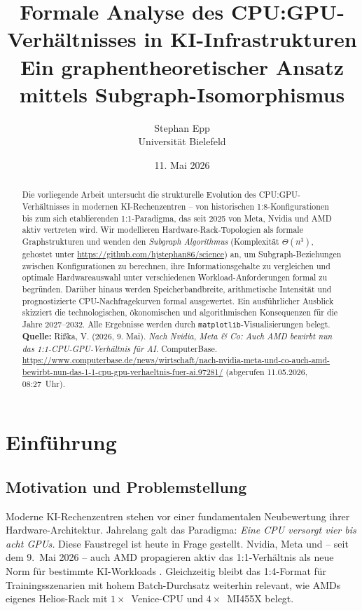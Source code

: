 ﻿\documentclass[a4paper,12pt]{article}
\title{\textbf{Formale Analyse des CPU:GPU-Verhältnisses in KI-Infrastrukturen}\\[0.4em]
\large Ein graphentheoretischer Ansatz mittels Subgraph-Isomorphismus}
\author{Stephan Epp\\
\small Universit\"at Bielefeld}
\date{11. Mai 2026}
\theoremstyle{definition}
\begin{document}
\maketitle

\begin{abstract}
Die vorliegende Arbeit untersucht die strukturelle Evolution des CPU:GPU-Verh\"altnisses
in modernen KI-Rechenzentren -- von historischen 1:8-Konfigurationen bis zum sich
etablierenden 1:1-Paradigma, das seit 2025 von Meta, Nvidia und AMD aktiv vertreten wird.
Wir modellieren Hardware-Rack-Topologien als formale Graphstrukturen und wenden den
\emph{Subgraph Algorithmus} \cite{epp2026subgraph} (Komplexit\"at $\Theta(n^3)$,
gehostet unter \url{https://github.com/hjstephan86/science}) an, um Subgraph-Beziehungen
zwischen Konfigurationen zu berechnen, ihre Informationsgehalte zu vergleichen und
optimale Hardwareauswahl unter verschiedenen Workload-Anforderungen formal zu begr\"unden.
Dar\"uber hinaus werden Speicherbandbreite, arithmetische Intensit\"at und prognostizierte
CPU-Nachfragekurven formal ausgewertet. Ein ausf\"uhrlicher Ausblick skizziert die
technologischen, \"okonomischen und algorithmischen Konsequenzen f\"ur die Jahre
2027--2032. Alle Ergebnisse werden durch \texttt{matplotlib}-Visualisierungen belegt.\\[0.5em]
\textbf{Quelle:} Rißka, V. (2026, 9. Mai). \textit{Nach Nvidia, Meta \& Co: Auch AMD bewirbt nun das 1:1-CPU-GPU-Verh\"altnis f\"ur AI}. ComputerBase.
\url{https://www.computerbase.de/news/wirtschaft/nach-nvidia-meta-und-co-auch-amd-bewirbt-nun-das-1-1-cpu-gpu-verhaeltnis-fuer-ai.97281/}
(abgerufen 11.05.2026, 08:27~Uhr).
\end{abstract}

\tableofcontents
\newpage

\section{Einf\"uhrung}

\subsection{Motivation und Problemstellung}

Moderne KI-Rechenzentren stehen vor einer fundamentalen Neubewertung ihrer
Hardware-Architektur. Jahrelang galt das Paradigma: \emph{Eine CPU versorgt vier bis acht
GPUs.} Diese Faustregel ist heute in Frage gestellt. Nvidia, Meta und -- seit dem
9.~Mai 2026 -- auch AMD propagieren aktiv das 1:1-Verh\"altnis als neue Norm f\"ur
bestimmte KI-Workloads \cite{computerbase2026}. Gleichzeitig bleibt das 1:4-Format
f\"ur Trainingsszenarien mit hohem Batch-Durchsatz weiterhin relevant, wie AMDs eigenes
Helios-Rack mit $1\times$~Venice-CPU und $4\times$~MI455X belegt.
\end{document}
